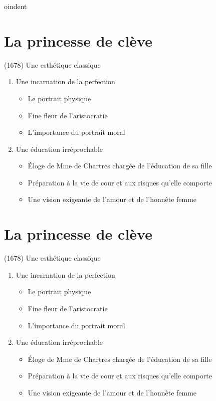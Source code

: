 \documentclass[12pt,a4paper]{article}
\begin{document}
oindent\hrulefill

\section*{La princesse de clève}
	(1678) Une esthétique classique
\begin{enumerate}
   \item Une incarnation de la perfection
   \begin{itemize}
     \item Le portrait physique
     \item Fine fleur de l'aristocratie
     \item L'importance du portrait moral
   \end{itemize}
   \item Une éducation irréprochable
   \begin{itemize}
       \item Éloge de Mme de Chartres chargée de l'éducation de sa fille
       \item Préparation à la vie de cour et aux risques qu'elle comporte
       \item Une vision exigeante de l'amour et de l'honnête femme
    \end{itemize}
\end{enumerate}

\section*{La princesse de clève}
	(1678) Une esthétique classique
\begin{enumerate}
   \item Une incarnation de la perfection
   \begin{itemize}
     \item Le portrait physique
     \item Fine fleur de l'aristocratie
     \item L'importance du portrait moral
   \end{itemize}
   \item Une éducation irréprochable
   \begin{itemize}
       \item Éloge de Mme de Chartres chargée de l'éducation de sa fille
       \item Préparation à la vie de cour et aux risques qu'elle comporte
       \item Une vision exigeante de l'amour et de l'honnête femme
    \end{itemize}
\end{enumerate}
\end{document}
